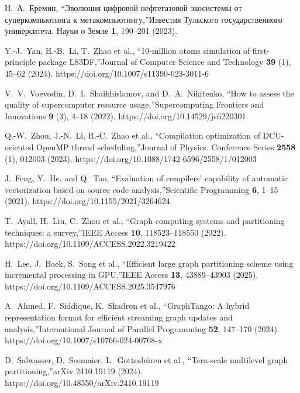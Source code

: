 \documentclass[
11pt,%
tightenlines,%
twoside,%
onecolumn,%
nofloats,%
nobibnotes,%
nofootinbib,%
superscriptaddress,%
noshowpacs,%
centertags]%
{revtex4}
\begin{document}
\begin{thebibliography}{99}
Н.~А.~Еремин, \textquotedblleft Эволюция цифровой нефтегазовой экосистемы от суперкомпьютинга к метакомпьютингу,\textquotedblright Известия Тульского государственного университета. Науки о Земле \textbf{1}, 190--201 (2023).

Y.-J.~Yan, H.-B.~Li, T.~Zhao et al., \textquotedblleft 10-million atoms simulation of first-principle package LS3DF,\textquotedblright Journal of Computer Science and Technology \textbf{39} (1), 45--62 (2024). https://doi.org/10.1007/s11390-023-3011-6

V.~V.~Voevodin, D.~I.~Shaikhislamov, and D.~A.~Nikitenko, \textquotedblleft How to assess the quality of supercomputer resource usage,\textquotedblright Supercomputing Frontiers and Innovations \textbf{9} (3), 4--18 (2022). https://doi.org/10.14529/jsfi220301

Q.-W.~Zhou, J.-N.~Li, R.-C.~Zhao et al., \textquotedblleft Compilation optimization of DCU-oriented OpenMP thread scheduling,\textquotedblright Journal of Physics. Conference Series \textbf{2558} (1), 012003 (2023). https://doi.org/10.1088/1742-6596/2558/1/012003

J.~Feng, Y.~He, and Q.~Tao, \textquotedblleft Evaluation of compilers’ capability of automatic vectorization based on source code analysis,\textquotedblright Scientific Programming \textbf{6}, 1--15 (2021). https://doi.org/10.1155/2021/3264624

T.~Ayall, H.~Liu, C.~Zhou et al., \textquotedblleft Graph computing systems and partitioning techniques: a survey,\textquotedblright IEEE Access \textbf{10}, 118523--118550 (2022). https://doi.org/10.1109/ACCESS.2022.3219422

H.~Lee, J.~Baek, S.~Song et al., \textquotedblleft Efficient large graph partitioning scheme using incremental processing in GPU,\textquotedblright IEEE Access \textbf{13}, 43889--43903 (2025). https://doi.org/10.1109/ACCESS.2025.3547976

A.~Ahmed, F.~Siddique, K.~Skadron et al., \textquotedblleft GraphTango: A hybrid representation format for efficient streaming graph updates and analysis,\textquotedblright International Journal of Parallel Programming \textbf{52}, 147--170 (2024). https://doi.org/10.1007/s10766-024-00768-x

D.~Salwasser, D.~Seemaier, L.~Gottesb\"uren et al., \textquotedblleft Tera-scale multilevel graph partitioning,\textquotedblright arXiv 2410.19119 (2024). https://doi.org/10.48550/arXiv.2410.19119


\end{thebibliography}
\end{document}

